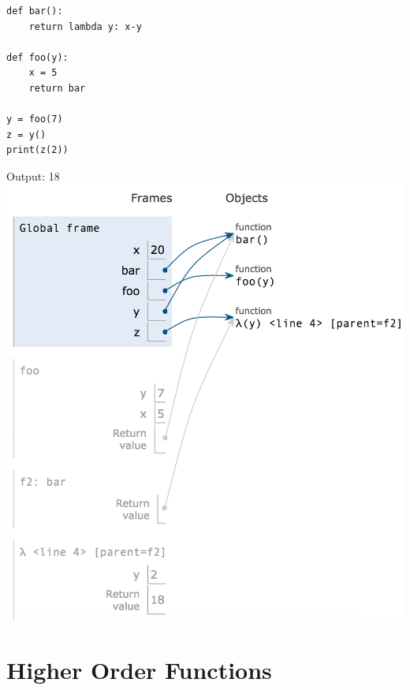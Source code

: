 \documentclass{exam}
\begin{document}
\begin{questions}
\begin{blocksection}
\begin{lstlisting}
def bar():
    return lambda y: x-y

def foo(y):
    x = 5
    return bar

y = foo(7)
z = y()
print(z(2))
\end{lstlisting}

\begin{solution}[0.3in]
   Output: 18 \newline
    \includegraphics[scale=0.5]{img/foobar2.png}
\end{solution}
\end{blocksection}
\end{questions}

\section{Higher Order Functions}
\end{document}
